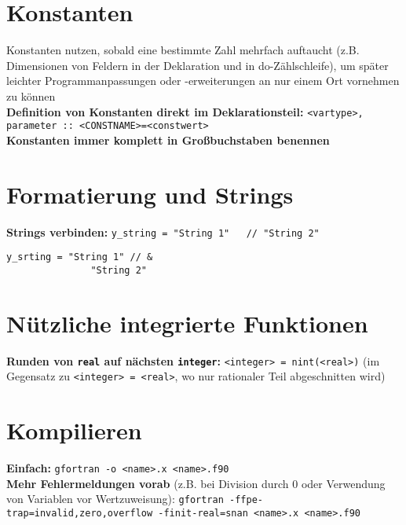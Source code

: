 \documentclass[a4paper, twocolumn]{scrarticle}
\begin{document}
  \section{Konstanten}
  Konstanten nutzen, sobald eine bestimmte Zahl mehrfach auftaucht (z.B. Dimensionen von Feldern in der Deklaration und in do-Zählschleife), um später leichter Programmanpassungen oder -erweiterungen an nur einem Ort vornehmen zu können\\
  \textbf{Definition von Konstanten direkt im Deklarationsteil:} \lstinline|<vartype>, parameter :: <CONSTNAME>=<constwert>| \\
 \textbf{ Konstanten immer komplett in Großbuchstaben benennen}
  \section{Formatierung und Strings}
 \textbf{ Strings verbinden:} \lstinline|y_string = "String 1"   // "String 2"|
  \begin{lstlisting}[caption={\bfseries String-Verkettung über Code-Zeilen hinweg},label=lst:stringkette]
    y_srting = "String 1" // &
               "String 2"
  \end{lstlisting}
  
  \section{Nützliche integrierte Funktionen}
  \textbf{Runden von \lstinline|real| auf nächsten \lstinline|integer|:} \lstinline|<integer> = nint(<real>)| (im Gegensatz zu \lstinline|<integer> = <real>|, wo nur rationaler Teil abgeschnitten wird)
  
  \section{Kompilieren}
  \textbf{Einfach:} \lstinline[style=neutral]|gfortran -o <name>.x <name>.f90| \\
  \textbf{Mehr Fehlermeldungen vorab} (z.B. bei Division durch 0 oder Verwendung von Variablen vor Wertzuweisung): \lstinline[style=neutral]|gfortran -ffpe-trap=invalid,zero,overflow -finit-real=snan <name>.x <name>.f90|
\end{document}

